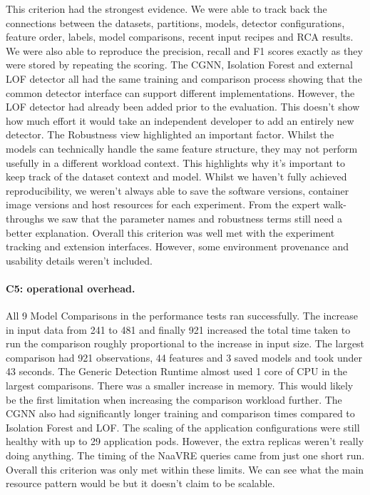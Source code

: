 This criterion had the strongest evidence. We were able to track back the connections between the datasets, partitions, models, detector configurations, feature order, labels, model comparisons, recent input recipes and RCA results. We were also able to reproduce the precision, recall and F1 scores exactly as they were stored by repeating the scoring. The CGNN, Isolation Forest and external LOF detector all had the same training and comparison process showing that the common detector interface can support different implementations. However, the LOF detector had already been added prior to the evaluation. This doesn’t show how much effort it would take an independent developer to add an entirely new detector. The Robustness view highlighted an important factor. Whilst the models can technically handle the same feature structure, they may not perform usefully in a different workload context. This highlights why it’s important to keep track of the dataset context and model. Whilst we haven’t fully achieved reproducibility, we weren’t always able to save the software versions, container image versions and host resources for each experiment. From the expert walk-throughs we saw that the parameter names and robustness terms still need a better explanation. Overall this criterion was well met with the experiment tracking and extension interfaces. However, some environment provenance and usability details weren’t included.

\paragraph{C5: operational overhead.}

All 9 Model Comparisons in the performance tests ran successfully. The increase in input data from 241 to 481 and finally 921 increased the total time taken to run the comparison roughly proportional to the increase in input size. The largest comparison had 921 observations, 44 features and 3 saved models and took under 43 seconds. The Generic Detection Runtime almost used 1 core of CPU in the largest comparisons. There was a smaller increase in memory. This would likely be the first limitation when increasing the comparison workload further. The CGNN also had significantly longer training and comparison times compared to Isolation Forest and LOF. The scaling of the application configurations were still healthy with up to 29 application pods. However, the extra replicas weren’t really doing anything. The timing of the NaaVRE queries came from just one short run. Overall this criterion was only met within these limits. We can see what the main resource pattern would be but it doesn’t claim to be scalable.

